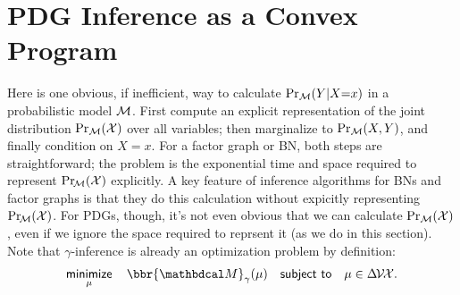 \documentclass[twoside]{article}
\newcommand\discard[1]{}
\begin{document}
\section{PDG Inference as a Convex Program}
    \label{sec:inf-as-cvx-program}

Here is one obvious, if inefficient, way to calculate $\Pr_{\cal M}(Y|X{=}x)$ in a
probabilistic model $\cal M$. First compute an explicit representation of the joint distribution $\Pr_{\cal M}(\mathcal X)$ over all variables; then marginalize to $\Pr_{\cal M}(X,Y)$, and finally condition on $X\!=\!x$.
%
For a factor graph
or BN, both steps are straightforward;
the problem is the exponential time and space required to represent $\Pr_{\!\cal M}(\mathcal X)$ explicitly.
A key feature of inference algorithms for BNs and factor graphs is that they do this calculation without expicitly representing $\Pr_{\!\cal M}(\mathcal X)$.
%
For PDGs, though, it's not even obvious that
we can calculate $\Pr_{\cal M}(\mathcal X)$, even if we ignore the space required to reprsent it (as we do in this section).
Note that $\gamma$-inference is already an optimization problem by definition:
\[
    \mathop{\text{\sf minimize}}\limits_\mu\quad
        \bbr{\dg M}_\gamma(\mu)
    \quad \text{\sf subject to}\quad \mu \in \Delta\mskip-2mu\V\mskip-2mu\X.
\]
\end{document}

